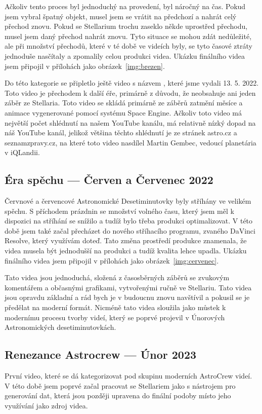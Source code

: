 \documentclass[12pt,a4paper,titlepage]{article}
\begin{document}
Ačkoliv tento proces byl jednoduchý na provedení, byl náročný na čas. Pokud jsem vybral špatný objekt, musel jsem se vrátit na předchozí a nahrát celý přechod znovu. Pokud se Stellarium trochu zaseklo někde uprostřed přechodu, musel jsem daný přechod nahrát znovu. Tyto situace se mohou zdát nedůležité, ale při množství přechodů, které v té době ve videích byly, se tyto časové ztráty jednoduše nasčítaly a zpomalily celou produkci videa. Ukázku finálního videa jsem připojil v přílohách jako obrázek~\ref{img:brezen}.

Do této kategorie se připletlo ještě video s názvem , které jsme vydali 13. 5. 2022. Toto video je přechodem k další éře, primárně z důvodu, že neobsahuje ani jeden záběr ze Stellaria. Toto video se skládá primárně ze záběrů zatmění měsíce a animace vygenerované pomocí systému Space Engine. Ačkoliv toto video má největší počet shlédnutí na našem YouTube kanálu, má relativně nízký dopad na náš YouTube kanál, jelikož většina těchto shlédnutí je ze stránek astro.cz a seznamzpravy.cz, na které toto video nasdílel Martin Gembec, vedoucí planetária v iQLandii.
\subsection{Éra spěchu --- Červen a Červenec 2022}
Červnové a červencové Astronomické Desetiminutovky byly stříhány ve velikém spěchu. S příchodem prázdnin se množství volného času, který jsem měl k dispozici na stříhání se snížilo a tudíž bylo třeba produkci optimalizovat. V této době jsem také začal přecházet do nového stříhacího programu, zvaného DaVinci Resolve, který využívám doteď. Tato změna prostředí produkce znamenala, že videa musela být jednodušší na produkci a tudíž kvalita lehce upadla. Ukázku finálního videa jsem připojil v přílohách jako obrázek~\ref{img:cervenec}.

Tato videa jsou jednoduchá, složená z časosběrných záběrů se zvukovým komentářem a občasnými grafikami, vytvořenými ručně ve Stellariu. Tato videa jsou opravdu základní a rád bych je v budoucnu znovu navštívil a pokusil se je předělat na moderní formát. Nicméně tato videa sloužila jako můstek k modernímu procesu tvorby videí, který se poprvé projevil v Únorových Astronomických desetiminutovkách.
\subsection{Renezance Astrocrew --- Únor 2023}
První video, které se dá kategorizovat pod skupinu moderních AstroCrew videí. V této době jsem poprvé začal pracovat se Stellariem jako s nástrojem pro generování dat, která jsou později upravena do finální podoby místo jeho využívání jako zdroj videa. 
\end{document}
